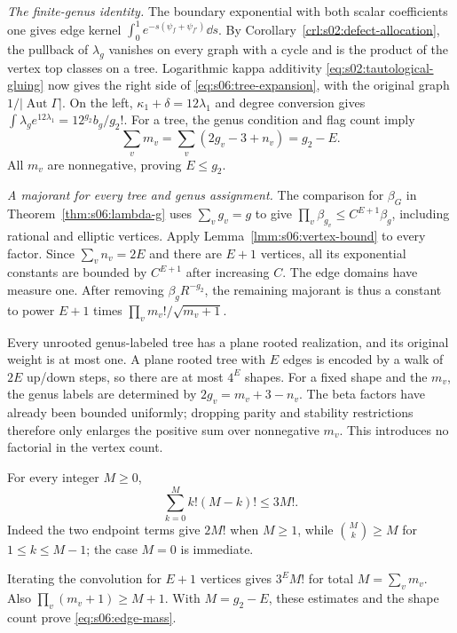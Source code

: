 \begin{prf}
\emph{The finite-genus identity.}
The boundary exponential with both scalar coefficients one gives
edge kernel $\int_0^1e^{-s(\psi_f+\psi_{f'})}\dd s$.
By Corollary~\ref{crl:s02:defect-allocation}, the pullback of
$\lambda_g$ vanishes on every graph with a cycle and is the product
of the vertex top classes on a tree. Logarithmic kappa additivity
\eqref{eq:s02:tautological-gluing} now gives the right side of
\eqref{eq:s06:tree-expansion}, with the original graph
$1/|\operatorname{Aut}\Gamma|$.
On the left, $\kappa_1+\delta=12\lambda_1$ and degree conversion
gives $\int\lambda_ge^{12\lambda_1}=12^{g_2}b_g/g_2!$.
For a tree, the genus condition and flag count imply
\begin{equation}\label{eq:s06:tree-degree}
 \sum_v m_v=\sum_v(2g_v-3+n_v)=g_2-E.
\end{equation}
All $m_v$ are nonnegative, proving $E\leq g_2$.

\emph{A majorant for every tree and genus assignment.}
The comparison for $\beta_G$ in Theorem~\ref{thm:s06:lambda-g}
uses $\sum_v g_v=g$ to give
$\prod_v\beta_{g_v}\leq C^{E+1}\beta_g$, including rational and
elliptic vertices. Apply Lemma~\ref{lmm:s06:vertex-bound} to
every factor. Since $\sum_v n_v=2E$ and there are $E+1$ vertices,
all its exponential constants are bounded by $C^{E+1}$ after
increasing $C$. The edge domains have measure one. After removing
$\beta_gR^{-g_2}$, the remaining majorant is thus a constant to
power $E+1$ times
$\prod_v m_v!/\sqrt{m_v+1}$.

Every unrooted genus-labeled tree has a plane rooted realization,
and its original weight is at most one. A plane rooted tree with
$E$ edges is encoded by a walk of $2E$ up/down steps, so there are
at most $4^E$ shapes. For a fixed shape and the $m_v$, the genus
labels are determined by $2g_v=m_v+3-n_v$. The beta factors have
already been bounded uniformly; dropping parity and stability restrictions
therefore only enlarges the positive sum over nonnegative $m_v$.
This introduces no factorial in the vertex count.

For every integer $M\geq0$,
\begin{equation}\label{eq:s06:factorial-convolution}
 \sum_{k=0}^M k!(M-k)!\leq3M!.
\end{equation}
Indeed the two endpoint terms give $2M!$ when $M\geq1$, while
$\binom{M}{k}\geq M$ for $1\leq k\leq M-1$; the case $M=0$
is immediate.

Iterating the convolution for $E+1$ vertices gives
$3^EM!$ for total $M=\sum_v m_v$. Also
$\prod_v(m_v+1)\geq M+1$. With $M=g_2-E$, these estimates and
the shape count prove \eqref{eq:s06:edge-mass}.


\end{prf}
